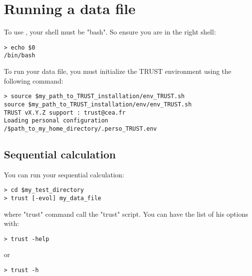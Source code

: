 \section{Running a data file}\label{Run}

To use \trust, your shell must be "bash". So ensure you are in the right shell:
\begin{verbatim}
> echo $0
/bin/bash
\end{verbatim}

To run your data file, you must initialize the TRUST environment using the following command:
\begin{verbatim}
> source $my_path_to_TRUST_installation/env_TRUST.sh
source $my_path_to_TRUST_installation/env/env_TRUST.sh
TRUST vX.Y.Z support : trust@cea.fr
Loading personal configuration /$path_to_my_home_directory/.perso_TRUST.env
\end{verbatim}


\subsection{Sequential calculation}
You can run your sequential calculation:
\begin{verbatim}
> cd $my_test_directory
> trust [-evol] my_data_file
\end{verbatim}

where "trust" command call the "trust" script.
You can have the list of his options with:
\begin{verbatim}
> trust -help
\end{verbatim}
or
\begin{verbatim}
> trust -h
\end{verbatim}

